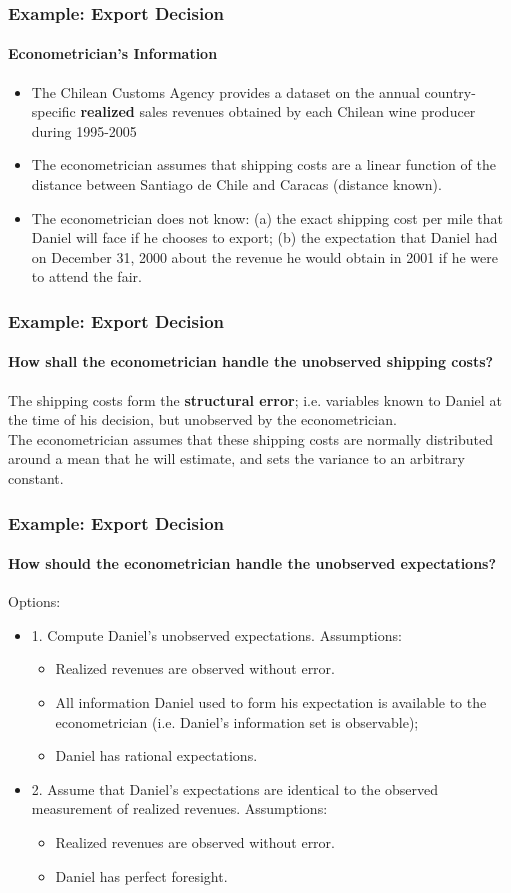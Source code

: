\begin{frame}
\frametitle{Example: Export Decision}
\framesubtitle{Econometrician's Information}
\begin{itemize}
\item The Chilean Customs Agency provides a dataset on the annual country-specific \textbf{realized} sales revenues obtained by each Chilean wine producer during 1995-2005
\item The econometrician assumes that shipping costs are a linear function of the distance between Santiago de Chile and Caracas (distance known).
\item The econometrician does not know: (a) the exact shipping cost per mile that Daniel will face if he chooses to export; (b) the expectation that Daniel had on December 31, 2000 about the revenue he would obtain in 2001 if he were to attend the fair.
\end{itemize}
\end{frame}
\begin{frame}
\frametitle{Example: Export Decision}
\framesubtitle{How shall the econometrician handle the unobserved shipping costs?}

The shipping costs form the \textbf{structural error}; i.e. variables known to Daniel at the time of his decision, but unobserved by the econometrician.\\
\bigskip
The econometrician assumes that these shipping costs are normally distributed around a mean that he will estimate, and sets the variance to an arbitrary constant.
\end{frame}
\begin{frame}
\frametitle{Example: Export Decision}
\framesubtitle{How should the econometrician handle the unobserved expectations?}

Options:
\begin{itemize}
	\item 1. Compute Daniel's unobserved expectations. Assumptions:
	\begin{itemize}
		\item Realized revenues are observed without error.
		\item All information Daniel used to form his expectation is available to the econometrician (i.e. Daniel's information set is observable); 
		\item Daniel has rational expectations.
	\end{itemize}
	\pause
	\item 2. Assume that Daniel's expectations are identical to the observed measurement of realized revenues. Assumptions:
	\begin{itemize}	
		\item Realized revenues are observed without error.
		\item Daniel has perfect foresight.
	\end{itemize}
\end{itemize}
\end{frame}

